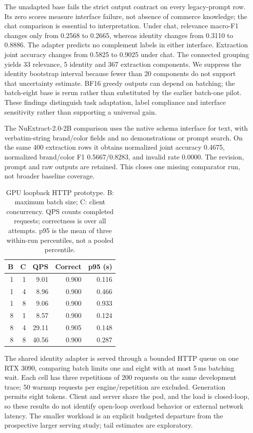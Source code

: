 The unadapted base fails the strict output contract on every legacy-prompt
row. Its zero scores measure interface failure, not absence of commerce knowledge;
the chat comparison is essential to interpretation. Under chat, relevance
macro-F1 changes only from 0.2568 to 0.2665, whereas identity changes from 0.3110
to 0.8886. The adapter predicts no complement labels in either interface.
Extraction joint accuracy changes from 0.5825 to 0.9025 under chat.
The connected grouping yields 33 relevance, 5 identity and 367 extraction
components. We suppress the identity bootstrap interval because fewer than 20 components
do not support that uncertainty estimate. BF16 greedy outputs can depend on
batching; the batch-eight base is rerun rather than substituted by the earlier
batch-one pilot. These findings distinguish task adaptation, label compliance
and interface sensitivity rather than supporting a universal gain.

The NuExtract-2.0-2B comparison uses the native schema interface for text, with
verbatim-string brand/color fields and no demonstrations or prompt search.
On the same 400 extraction rows it obtains normalized joint accuracy
0.4675, normalized brand/color F1
0.5667/0.8283, and invalid rate
0.0000. The revision, prompt and raw outputs are
retained. This closes one missing comparator run, not broader baseline coverage.

\begin{table}[t]
\centering\small
\caption{GPU loopback HTTP prototype. B: maximum batch size; C: client
concurrency. QPS counts completed requests; correctness is over all attempts.
p95 is the mean of three within-run percentiles, not a pooled percentile.}
\label{tab:httpfollowup}
\setlength{\tabcolsep}{3pt}
\begin{tabular}{rrrrr}\toprule
B & C & QPS & Correct & p95 (s)\\\midrule
1 & 1 & 9.01 & 0.900 & 0.116 \\
1 & 4 & 8.96 & 0.900 & 0.466 \\
1 & 8 & 9.06 & 0.900 & 0.933 \\
8 & 1 & 8.57 & 0.900 & 0.124 \\
8 & 4 & 29.11 & 0.905 & 0.148 \\
8 & 8 & 40.56 & 0.900 & 0.287 \\
\bottomrule\end{tabular}\end{table}

The shared identity adapter is served through a bounded HTTP queue on one
RTX 3090, comparing batch limits one and eight with at most 5\,ms batching wait.
Each cell has three repetitions of 200 requests on the same development trace;
50 warmup requests per engine/repetition are excluded. Generation permits eight
tokens. Client and server share the pod, and the load is closed-loop, so these
results do not identify open-loop overload behavior or external network latency.
The smaller workload is an explicit budgeted departure from the prospective
larger serving study; tail estimates are exploratory.

